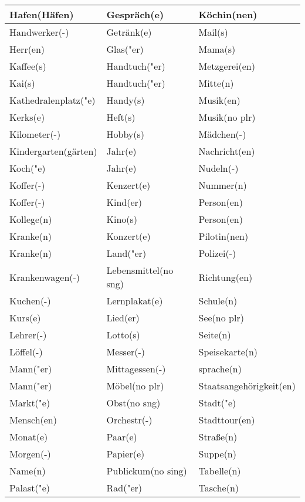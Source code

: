 \documentclass{article}
\begin{document}
\begin{table}[h!]
\begin{tabular}{|>{\raggedright\arraybackslash}p{5cm}|>{\raggedright\arraybackslash}p{5cm}|>{\raggedright\arraybackslash}p{5cm}|}
        Hafen(Häfen) & Gespräch(e) & Köchin(nen) \\\hline
        Handwerker(-) & Getränk(e) & Mail(s) \\\hline
        Herr(en) & Glas("er) & Mama(s) \\\hline
        Kaffee(s) & Handtuch("er) & Metzgerei(en) \\\hline
        Kai(s) & Handtuch("er) & Mitte(n) \\\hline
        Kathedralenplatz("e) & Handy(s) & Musik(en) \\\hline
        Kerks(e) & Heft(s) & Musik(no plr) \\\hline
        Kilometer(-) & Hobby(s) & Mädchen(-) \\\hline
        Kindergarten(gärten) & Jahr(e) & Nachricht(en) \\\hline
        Koch("e) & Jahr(e) & Nudeln(-) \\\hline
        Koffer(-) & Kenzert(e) & Nummer(n) \\\hline
        Koffer(-) & Kind(er) & Person(en) \\\hline
        Kollege(n) & Kino(s) & Person(en) \\\hline
        Kranke(n) & Konzert(e) & Pilotin(nen) \\\hline
        Kranke(n) & Land("er) & Polizei(-) \\\hline
        Krankenwagen(-) & Lebensmittel(no sng) & Richtung(en) \\\hline
        Kuchen(-) & Lernplakat(e) & Schule(n) \\\hline
        Kurs(e) & Lied(er) & See(no plr) \\\hline
        Lehrer(-) & Lotto(s) & Seite(n) \\\hline
        Löffel(-) & Messer(-) & Speisekarte(n) \\\hline
        Mann("er) & Mittagessen(-) & sprache(n) \\\hline
        Mann("er) & Möbel(no plr) & Staatsangehörigkeit(en) \\\hline
        Markt("e) & Obst(no sng) & Stadt("e) \\\hline
        Mensch(en) & Orchestr(-) & Stadttour(en) \\\hline
        Monat(e) & Paar(e) & Stra\ss{}e(n) \\\hline
        Morgen(-) & Papier(e) & Suppe(n) \\\hline
        Name(n) & Publickum(no sing) & Tabelle(n) \\\hline
        Palast("e) & Rad("er) & Tasche(n) \\\hline

\end{tabular}
\end{table}
\end{document}
